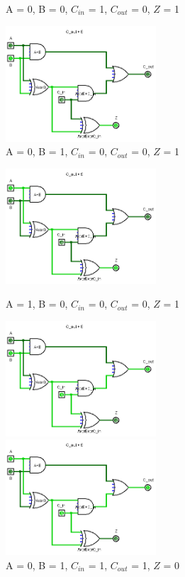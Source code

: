 \documentclass{templateNote}
\begin{document}
\begin{enumerate}
\begin{itemize}
\begin{figure}[H]
            \caption{A = 0, B = 0, $C_{in}$ = 1, $C_{out}$ = 0, $Z$ = 1}
            \centering
            \includegraphics[width=0.5\textwidth]{img/010.png}
            \caption{A = 0, B = 1, $C_{in}$ = 0, $C_{out}$ = 0, $Z$ = 1}
        \end{figure}
        \begin{figure}[H]
            \centering
            \includegraphics[width=0.5\textwidth]{img/100.png}
            \caption{A = 1, B = 0, $C_{in}$ = 0, $C_{out}$ = 0, $Z$ = 1}
            \centering
            \includegraphics[width=0.5\textwidth]{img/011.png}
            \caption{A = 0, B = 1, $C_{in}$ = 1, $C_{out}$ = 1, $Z$ = 0}
            \centering
            \includegraphics[width=0.5\textwidth]{img/101.png}

\end{figure}
\end{itemize}
\end{enumerate}
\end{document}
